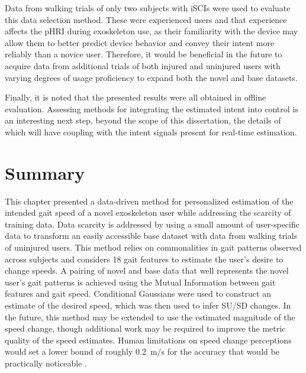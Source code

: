 Data from walking trials of only two subjects with iSCIs were used to evaluate this data selection method. These were experienced users and that experience affects the pHRI during exoskeleton use, as their familiarity with the device may allow them to better predict device behavior and convey their intent more reliably than a novice user. Therefore, it would be beneficial in the future to acquire data from additional trials of both injured and uninjured users with varying degrees of usage proficiency to expand both the novel and base datasets.

Finally, it is noted that the presented results were all obtained in offline evaluation. Assessing methods for integrating the estimated intent into control is an interesting next step, beyond the scope of this dissertation, the details of which will have coupling with the intent signals present for real-time estimation.

\section{Summary} \label{sec:conclusion}
%
This chapter presented a data-driven method for personalized estimation of the intended gait speed of a novel exoskeleton user while addressing the scarcity of training data. Data scarcity is addressed by using a small amount of user-specific data to transform an easily accessible base dataset with data from walking trials of uninjured users. This method relies on commonalities in gait patterns observed across subjects and considers 18 gait features to estimate the user's desire to change speeds. A pairing of novel and base data that well represents the novel user's gait patterns is achieved using the Mutual Information between gait features and gait speed. Conditional Gaussians were used to construct an estimate of the desired speed, which was then used to infer SU/SD changes. In the future, this method may be extended to use the estimated magnitude of the speed change, though additional work may be required to improve the metric quality of the speed estimates. Human limitations on speed change perceptions would set a lower bound of roughly 0.2~m/s for the  accuracy that would be practically noticeable \cite{zhang2015investigation}.